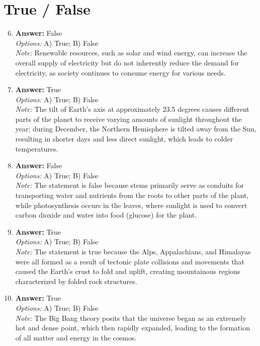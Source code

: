 \documentclass[12pt]{article}
\begin{document}
\section*{True / False}
\begin{enumerate}[label=\arabic*.]
\setcounter{enumi}{5}
\item \textbf{Answer:} False
\\ \textit{Options:} A) True; B) False
\\ \textit{Note:} Renewable resources, such as solar and wind energy, can increase the overall supply of electricity but do not inherently reduce the demand for electricity, as society continues to consume energy for various needs.
\item \textbf{Answer:} True
\\ \textit{Options:} A) True; B) False
\\ \textit{Note:} The tilt of Earth's axis at approximately 23.5 degrees causes different parts of the planet to receive varying amounts of sunlight throughout the year; during December, the Northern Hemisphere is tilted away from the Sun, resulting in shorter days and less direct sunlight, which leads to colder temperatures.
\item \textbf{Answer:} False
\\ \textit{Options:} A) True; B) False
\\ \textit{Note:} The statement is false because stems primarily serve as conduits for transporting water and nutrients from the roots to other parts of the plant, while photosynthesis occurs in the leaves, where sunlight is used to convert carbon dioxide and water into food (glucose) for the plant.
\item \textbf{Answer:} True
\\ \textit{Options:} A) True; B) False
\\ \textit{Note:} The statement is true because the Alps, Appalachians, and Himalayas were all formed as a result of tectonic plate collisions and movements that caused the Earth's crust to fold and uplift, creating mountainous regions characterized by folded rock structures.
\item \textbf{Answer:} True
\\ \textit{Options:} A) True; B) False
\\ \textit{Note:} The Big Bang theory posits that the universe began as an extremely hot and dense point, which then rapidly expanded, leading to the formation of all matter and energy in the cosmos.
\end{enumerate}
\end{document}
